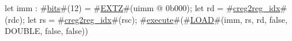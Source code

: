 let imm : #\hyperref[sailRISCVzbits]{bits}#(12) = #\hyperref[sailRISCVzEXTZ]{EXTZ}#(uimm @ 0b000);
let rd = #\hyperref[sailRISCVzcreg2regzyidx]{creg2reg\_idx}#(rdc);
let rs = #\hyperref[sailRISCVzcreg2regzyidx]{creg2reg\_idx}#(rsc);
#\hyperref[sailRISCVzexecute]{execute}#(#\hyperref[sailRISCVzLOAD]{LOAD}#(imm, rs, rd, false, DOUBLE, false, false))
